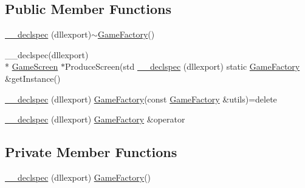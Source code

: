 \subsection*{Public Member Functions}
\begin{DoxyCompactItemize}
\item 
\hyperlink{class_game_factory_adaa8f1b9fe44c066743b786d1cd71bfb}{\-\_\-\-\_\-declspec} (dllexport)$\sim$\hyperlink{class_game_factory}{Game\-Factory}()
\item 
\-\_\-\-\_\-declspec(dllexport) \\*
\hyperlink{class_game_screen}{Game\-Screen} $\ast$Produce\-Screen(std \hyperlink{class_game_factory_a9079d555495e2691cce325afe77c4785}{\-\_\-\-\_\-declspec} (dllexport) static \hyperlink{class_game_factory}{Game\-Factory} \&get\-Instance()
\item 
\hyperlink{class_game_factory_a38779dd1a14a9e977614b14b01eb231f}{\-\_\-\-\_\-declspec} (dllexport) \hyperlink{class_game_factory}{Game\-Factory}(const \hyperlink{class_game_factory}{Game\-Factory} \&utils)=delete
\item 
\hyperlink{class_game_factory_a7d0a6fccc0aec8cf4d30ba31c945f04e}{\-\_\-\-\_\-declspec} (dllexport) \hyperlink{class_game_factory}{Game\-Factory} \&operator
\end{DoxyCompactItemize}
\subsection*{Private Member Functions}
\begin{DoxyCompactItemize}
\item 
\hyperlink{class_game_factory_a6cb0bea926e68e7e2a8267e56f37b27e}{\-\_\-\-\_\-declspec} (dllexport) \hyperlink{class_game_factory}{Game\-Factory}()
\end{DoxyCompactItemize}
